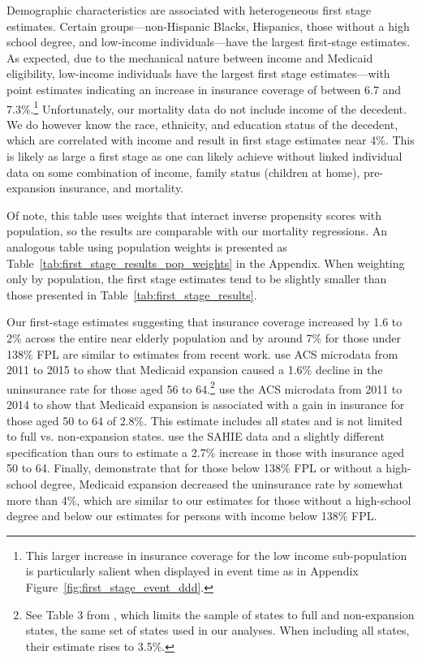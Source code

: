 \documentclass[12pt]{article}%
\begin{document}
  Demographic characteristics are associated with heterogeneous first stage estimates. 
  Certain groups---non-Hispanic Blacks, Hispanics, those without a high school degree, and low-income individuals---have the largest first-stage estimates. 
  As expected, due to the mechanical nature between income and Medicaid eligibility, low-income individuals have the largest first stage estimates—with point estimates indicating an increase in insurance coverage of between 6.7 and 7.3\%.\footnote{This larger increase in insurance coverage for the low income sub-population is particularly salient when displayed in event time as in Appendix Figure~\ref{fig:first_stage_event_ddd}.}
  Unfortunately, our mortality data do not include income of the decedent. 
  We do however know the race, ethnicity, and education status of the decedent, which are correlated with income and result in first stage estimates near 4\%.
  This is likely as large a first stage as one can likely achieve without linked individual data on some combination of income, family status (children at home), pre-expansion insurance, and mortality. 

  Of note, this table uses weights that interact inverse propensity scores with population, so the results are comparable with our mortality regressions. 
  An analogous table using population weights is presented as Table~\ref{tab:first_stage_results_pop_weights} in the Appendix. 
  When weighting only by population, the first stage estimates tend to be slightly smaller than those presented in Table~\ref{tab:first_stage_results}. 


  Our first-stage estimates suggesting that insurance coverage increased by 1.6 to 2\% across the entire near elderly population and by around 7\% for those under 138\% FPL are similar to estimates from recent work.  
    \citet{Wehby2018MedicaidandInsuranceProb} use ACS microdata from 2011 to 2015 to show that Medicaid expansion caused a 1.6\% decline in the uninsurance rate for those aged 56 to 64.\footnote{See Table 3 from \citet{Wehby2018MedicaidandInsuranceProb}, which limits the sample of states to full and non-expansion states, the same set of states used in our analyses. When including all states, their estimate rises to 3.5\%. } 
    \citet{Courtemanche2017MedicaidandInsurance} use the ACS microdata from 2011 to 2014 to show that Medicaid expansion is associated with a gain in insurance for those aged 50 to 64 of 2.8\%. 
    This estimate includes all states and is not limited to full vs. non-expansion states. 
    \citet{borgschulteDidACAMedicaid2020} use the SAHIE data and a slightly different specification than ours to estimate a 2.7\% increase in those with insurance aged 50 to 64. 
    Finally, \citet{millerMedicaidMortalityNew2019} demonstrate that for those below 138\% FPL or without a high-school degree, Medicaid expansion decreased the uninsurance rate by somewhat more than 4\%, which are similar to our estimates for those without a high-school degree and below our estimates for persons with income below 138\% FPL. 
\end{document}
